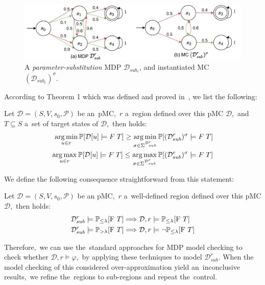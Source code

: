 \begin{figure}[h!]
\centering
\includegraphics[width=1.0\textwidth]{figures/sub_mc.pdf}
\caption{A \textit{parameter-substitution} MDP $\mathcal{D}_{sub_r}$, and instantiated MC $(\mathcal{D}_{sub_r})^\sigma$.}%
\label{fig:sub_mc}%
\end{figure}
\noindent
According to Theorem 1 which was defined and proved in~\cite{Quatmann2016}, we list the following:

\begin{theorem}[]
Let $\mathcal{D} = (S, V, s_0, \mathcal{P})$ be an~pMC,~$r$ a~region defined over this pMC $\mathcal{D}$,~and $T \subseteq S$ a~set of target states of $\mathcal{D}$,~then holds:
\begin{align*}
    \operatorname*{arg\,min}_{u \in r} \mathbb{P}[\mathcal{D}[u] \models F \; T] \geq \operatorname*{arg\,min}_{\sigma \in \Sigma^{\mathcal{D}_{sub}^{r}}} \mathbb{P}[(\mathcal{D}_{sub}^{r})^\sigma \models F \; T] \\
    \operatorname*{arg\,max}_{u \in r} \mathbb{P}[\mathcal{D}[u] \models F \; T] \leq \operatorname*{arg\,max}_{\sigma \in \Sigma^{\mathcal{D}_{sub}^{r}}} \mathbb{P}[(\mathcal{D}_{sub}^{r})^\sigma \models F \; T]
\end{align*}
\end{theorem}
\noindent
We define the following consequence straightforward from this statement:
\begin{theorem} \label{def:sub_mc_check}
Let $\mathcal{D} = (S, V, s_0, \mathcal{P})$ be an pMC,~$r$ a~well-defined region defined over this pMC $\mathcal{D}$,~then holds:
\begin{align*}
    \mathcal{D}_{sub}^{r} \models \mathbb{P}_{\leq \lambda}[\mathrm{F}\ T] \Longrightarrow \mathcal{D}, r \models & \; \mathbb{P}_{\leq \lambda}[\mathrm{F}\ T] \\
    \mathcal{D}_{sub}^{r} \models \mathbb{P}_{> \lambda}[\mathrm{F}\ T] \Longrightarrow \mathcal{D}, r \models & \; \neg\mathbb{P}_{\leq \lambda}[\mathrm{F}\ T]
\end{align*}
\end{theorem}
\noindent
Therefore,~we can use the~standard approaches for MDP model checking to check whether $\mathcal{D}, r \models \varphi$,~by applying these techniques to model $\mathcal{D}_{sub}^r$.
When the model checking of this considered over-approximation yield an~inconclusive results,~we refine the~regions to sub-regions and repeat the~control.

